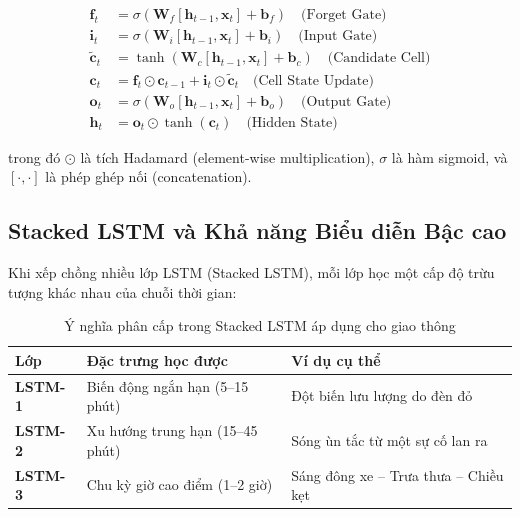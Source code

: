 \begin{align}
  \mathbf{f}_t &= \sigma(\mathbf{W}_f[\mathbf{h}_{t-1}, \mathbf{x}_t] + \mathbf{b}_f) \quad \text{(Forget Gate)} \label{eq:forget} \\
  \mathbf{i}_t &= \sigma(\mathbf{W}_i[\mathbf{h}_{t-1}, \mathbf{x}_t] + \mathbf{b}_i) \quad \text{(Input Gate)} \label{eq:input} \\
  \tilde{\mathbf{c}}_t &= \tanh(\mathbf{W}_c[\mathbf{h}_{t-1}, \mathbf{x}_t] + \mathbf{b}_c) \quad \text{(Candidate Cell)} \label{eq:candidate} \\
  \mathbf{c}_t &= \mathbf{f}_t \odot \mathbf{c}_{t-1} + \mathbf{i}_t \odot \tilde{\mathbf{c}}_t \quad \text{(Cell State Update)} \label{eq:cell} \\
  \mathbf{o}_t &= \sigma(\mathbf{W}_o[\mathbf{h}_{t-1}, \mathbf{x}_t] + \mathbf{b}_o) \quad \text{(Output Gate)} \label{eq:output_gate} \\
  \mathbf{h}_t &= \mathbf{o}_t \odot \tanh(\mathbf{c}_t) \quad \text{(Hidden State)} \label{eq:hidden}
\end{align}

trong đó $\odot$ là tích Hadamard (element-wise multiplication), $\sigma$ là hàm sigmoid, và $[\cdot, \cdot]$ là phép ghép nối (concatenation).

\subsection{Stacked LSTM và Khả năng Biểu diễn Bậc cao}

Khi xếp chồng nhiều lớp LSTM (Stacked LSTM), mỗi lớp học một cấp độ trừu tượng khác nhau của chuỗi thời gian:

\begin{table}[H]
\centering
\caption{Ý nghĩa phân cấp trong Stacked LSTM áp dụng cho giao thông}
\label{tab:stacked_lstm}
\renewcommand{\arraystretch}{1.4}
\begin{tabular}{>{\bfseries\centering}p{1.8cm} p{4cm} p{6.5cm}}
\toprule
\textbf{Lớp} & \textbf{Đặc trưng học được} & \textbf{Ví dụ cụ thể} \\
\midrule
LSTM-1 & Biến động ngắn hạn (5--15 phút) & Đột biến lưu lượng do đèn đỏ \\
\rowcolor{rowgray}
LSTM-2 & Xu hướng trung hạn (15--45 phút) & Sóng ùn tắc từ một sự cố lan ra \\
LSTM-3 & Chu kỳ giờ cao điểm (1--2 giờ) & Sáng đông xe -- Trưa thưa -- Chiều kẹt \\
\bottomrule
\end{tabular}
\end{table}

